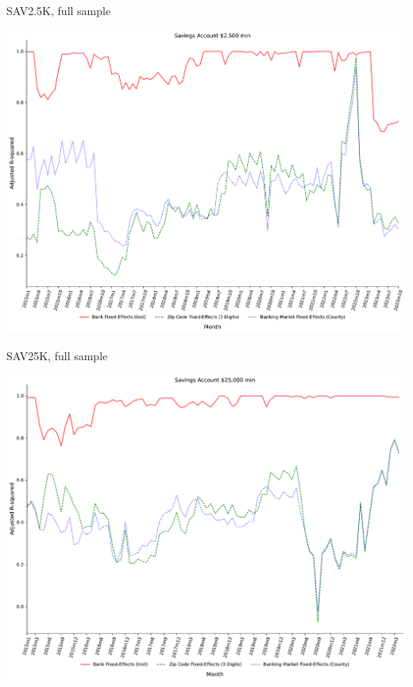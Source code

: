 \documentclass{beamer}
\begin{document}
\begin{frame}{SAV2.5K, full sample}
\begin{center}
\includegraphics[width=1\textwidth]{figure/all_sample_939605/3_fixed_effects_same_as_GP_wp/SAV2_5K_adjusted_R2_Rate_3_fixed_effects.pdf} 
\end{center}
\end{frame}



\begin{frame}{SAV25K, full sample}
\begin{center}
\includegraphics[width=1\textwidth]{figure/all_sample_939605/3_fixed_effects_same_as_GP_wp/SAV25K_adjusted_R2_Rate_3_fixed_effects.pdf} 
\end{center}
\end{frame}
\end{document}
